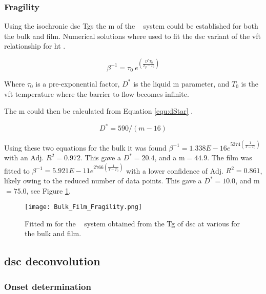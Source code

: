 \documentclass[a4paper,12pt,oneside]{article}%
\begin{document}
\subsubsection{Fragility}

Using the isochronic \acrshort{dsc} \glspl{Tg} the \gls{m} of the \MgZnCa~ system could be established for both the bulk and film. Numerical solutions where used to fit the \acrshort{dsc} variant of the \gls{vft} relationship for \gls{ht} \cite{Busch1998}.

\begin{equation}
	\beta^{-1} = \tau_{0}~ e^{(\frac{D^{*}T_{0}}{T_{g}-T_{0}})}
	\label{equ:VFT}
\end{equation}

Where $\tau_{0}$ is a pre-exponential factor, $D^{*}$ is the liquid \acrlong{m} parameter, and $T_{0}$ is the \gls{vft} temperature where the barrier to flow becomes infinite.

The \gls{m} could then be calculated from Equation \ref{equ:dStar} \cite{Angell2002, Wei2014}.

\begin{equation}
	D^{*}=590/(m-16)
	\label{equ:dStar}
\end{equation}

Using these two equations for the bulk it was found $\beta^{-1} = 1.338E - 16e^{5274 (\frac{1}{T-T_{0}})}$ with an Adj. $R^{2}=0.972$. This gave a $D^{*}=20.4$, and a \gls{m}$=44.9$. The film was fitted to $\beta^{-1} = 5.921E - 11e^{2766 (\frac{1}{T-T_{0}})}$ with a lower confidence of Adj. $R^{2}=0.861$, likely owing to the reduced number of data points. This gave a $D^{*}=10.0$, and \gls{m}$=75.0$, see Figure \ref{fig:Fragility_BulkFilm_mValue}.

\begin{figure}[b]
	\centering
	\texttt{[image: Bulk\_Film\_Fragility.png]}
	\caption{Fitted \acrfull{m} for the \MgZnCa~ system obtained from the \gls{Tg} of \acrshort{dsc} at various  for the bulk and film.}
	\label{fig:Fragility_BulkFilm_mValue}
\end{figure}

\subsection{\acrshort{dsc} deconvolution}

\subsubsection{Onset determination}
\end{document}
